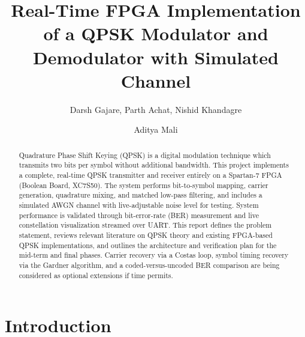 \documentclass[10pt,twocolumn,letterpaper]{article}
\begin{document}
\title{Real-Time FPGA Implementation of a QPSK Modulator and Demodulator with Simulated Channel}
\author{Darsh Gajare, Parth Achat, Nishid Khandagre \and Aditya Mali}
\maketitle


\begin{abstract}
	Quadrature Phase Shift Keying (QPSK) is a digital modulation technique which transmits two bits per symbol without additional bandwidth. This project implements a complete, real-time QPSK transmitter and receiver entirely on a Spartan-7 FPGA (Boolean Board, XC7S50). The system performs bit-to-symbol mapping, carrier generation, quadrature mixing, and matched low-pass filtering, and includes a simulated AWGN channel with live-adjustable noise level for testing. System performance is validated through bit-error-rate (BER) measurement and live constellation visualization streamed over UART. This report defines the problem statement, reviews relevant literature on QPSK theory and existing FPGA-based QPSK implementations, and outlines the architecture and verification plan for the mid-term and final phases. Carrier recovery via a Costas loop, symbol timing recovery via the Gardner algorithm, and a coded-versus-uncoded BER comparison are being considered as optional extensions if time permits.


\end{abstract}

\section{Introduction}

%
%
\end{document}

